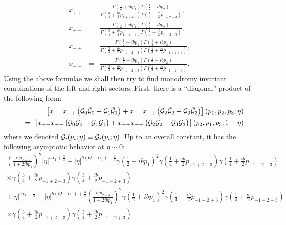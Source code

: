\documentclass[a4paper,12pt]{article}
\newcommand{\tfrac}[2]{{\textstyle\frac{#1}{#2}}}
\newcommand{\cG}{{\cal G}}
\begin{document}
\begin{eqnarray}
  x_{++} &=&
 \frac{\Gamma(\frac{1}{2}+ibp_1)\Gamma(\frac{1}{2}+ibp_2)}
      {\Gamma(\frac{3}{4}+\frac{ib}{2}p_{1+2+3})
       \Gamma(\frac{1}{4}+\frac{ib}{2}p_{1+2-3})},\nonumber \\
  x_{+-} &=&
 \frac{\Gamma(\frac{1}{2}+ibp_1)\Gamma(\frac{1}{2}-ibp_2)}
      {\Gamma(\frac{3}{4}+\frac{ib}{2}p_{1-2-3})
       \Gamma(\frac{1}{4}+\frac{ib}{2}p_{1-2+3})},\nonumber \\
  x_{-+} &=&
 \frac{\Gamma(\frac{1}{2}-ibp_1)\Gamma(\frac{1}{2}+ibp_2)}
      {\Gamma(\frac{3}{4}+\frac{ib}{2}p_{-1+2-3})
       \Gamma(\frac{1}{4}+\frac{ib}{2}p_{-1+2+3})},\nonumber \\
  x_{--} &=&
 \frac{\Gamma(\frac{1}{2}-ibp_1)\Gamma(\frac{1}{2}-ibp_2)}
      {\Gamma(\frac{3}{4}+\frac{ib}{2}p_{-1-2+3})
       \Gamma(\frac{1}{4}+\frac{ib}{2}p_{-1-2-3})}.
\end{eqnarray}
   Using the above formulae we shall then try to find monodromy
 invariant combinations of the left and right sectors.
 First, there is a ``diagonal'' product of the following form:
\begin{eqnarray}
 &&
  \left[
  x_{--}x_{-+}\left(\cG_0\bar{\cG}_0+\cG_1\bar{\cG}_1\right)
 +x_{+-}x_{++}\left(\cG_2\bar{\cG}_2+\cG_3\bar{\cG}_3\right)
  \right](p_1,p_2,p_3;\eta)
\nonumber \\&& ~=~
  \left[
  x_{--}x_{+-}\left(\cG_0\bar{\cG}_0+\cG_1\bar{\cG}_1\right)
 +x_{-+}x_{++}\left(\cG_2\bar{\cG}_2+\cG_3\bar{\cG}_3\right)
  \right](p_2,p_1,p_3;1-\eta)
\label{S4d}
\end{eqnarray}
 where we denoted $\bar{\cG}_i(p_i;\eta)\equiv\cG_i(p_i;\bar{\eta})$.
 Up to an overall constant, it has the following asymptotic behavior
 at $\eta\sim0$:
\begin{eqnarray}
   \left(\frac{ibp_{2-3}}{1+2ibp_1}\right)^2
   |\eta|^{b\alpha_1+\frac{3}{4}}
  +|\eta|^{b(Q-\alpha_1)-\frac{1}{4}}
   \gamma(\tfrac{1}{2}+ibp_1)^2
   \gamma(\tfrac{1}{4}+\tfrac{ib}{2}p_{-1+2+3})
   \gamma(\tfrac{1}{4}+\tfrac{ib}{2}p_{-1-2-3})
 \nonumber \\ \times
   \gamma(\tfrac{3}{4}+\tfrac{ib}{2}p_{-1+2-3})
   \gamma(\tfrac{3}{4}+\tfrac{ib}{2}p_{-1-2+3})
 \nonumber \\
  +|\eta|^{b\alpha_1-\frac{1}{4}}
  +|\eta|^{b(Q-\alpha_1)+\frac{3}{4}}
   \left(\frac{ibp_{2+3}}{1-2ibp_1}\right)^2
   \gamma(\tfrac{1}{2}+ibp_1)^2
   \gamma(\tfrac{1}{4}+\tfrac{ib}{2}p_{-1+2+3})
   \gamma(\tfrac{1}{4}+\tfrac{ib}{2}p_{-1-2-3})
 \nonumber \\ \times
   \gamma(\tfrac{3}{4}+\tfrac{ib}{2}p_{-1+2-3})
   \gamma(\tfrac{3}{4}+\tfrac{ib}{2}p_{-1-2+3})
\label{asS4}
\end{eqnarray}
\end{document}
